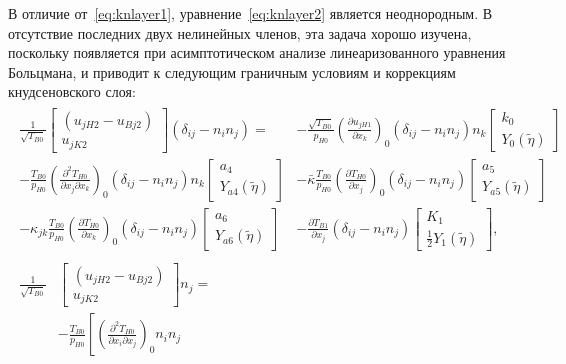 \documentclass[
aps,%
12pt,%
final,%
notitlepage,%
oneside,%
onecolumn,%
nobibnotes,%
nofootinbib,%
superscriptaddress,%
noshowpacs,%
showkeys,%
floatfix,%
tightenlines,%
centertags]%
{revtex4}
\newcommand{\pder}[2][]{\frac{\partial#1}{\partial#2}}
\newcommand{\pderder}[3][]{\frac{\partial^2#1}{\partial#2\partial#3}}
\newcommand{\deltann}[2]{(\delta_{#1#2}-n_#1 n_#2)}
\newcommand{\onwall}[1]{\left(#1\right)_0}
\begin{document}
В отличие от~\eqref{eq:knlayer1}, уравнение~\eqref{eq:knlayer2} является неоднородным.
В отсутствие последних двух нелинейных членов, эта задача хорошо изучена, поскольку появляется
при асимптотическом анализе линеаризованного уравнения Больцмана,
и приводит к следующим граничным условиям и коррекциям кнудсеновского слоя:
\begin{gather}
    \begin{aligned}
        \frac1{\sqrt{T_{B0}}}
            \begin{bmatrix} (u_{jH2} - u_{Bj2}) \\ u_{jK2} \end{bmatrix}\deltann{i}{j} =
        &- \frac{\sqrt{T_{B0}}}{p_{H0}}\onwall{\pder[u_{jH1}]{x_k}} \deltann{i}{j}n_k
            \begin{bmatrix} k_0 \\ Y_0(\tilde\eta) \end{bmatrix} \\
        - \frac{T_{B0}}{p_{H0}}\onwall{\pderder[T_{H0}]{x_j}{x_k}} \deltann{i}{j}n_k
            \begin{bmatrix} a_4 \\ Y_{a4}(\tilde\eta) \end{bmatrix}
        &- \bar\kappa\frac{T_{B0}}{p_{H0}}\onwall{\pder[T_{H0}]{x_j}} \deltann{i}{j}
            \begin{bmatrix} a_5 \\ Y_{a5}(\tilde\eta) \end{bmatrix} \\
        - \kappa_{jk}\frac{T_{B0}}{p_{H0}}\onwall{\pder[T_{H0}]{x_k}} \deltann{i}{j}
            \begin{bmatrix} a_6 \\ Y_{a6}(\tilde\eta) \end{bmatrix}
        &- \pder[T_{B1}]{x_j} \deltann{i}{j}
            \begin{bmatrix} K_1 \\ \frac12 Y_1(\tilde\eta) \end{bmatrix},
    \end{aligned}\label{eq:boundary_u2t}\\
    \begin{aligned}
        \frac1{\sqrt{T_{B0}}}
            &\begin{bmatrix} (u_{jH2} - u_{Bj2}) \\ u_{jK2} \end{bmatrix} n_j = \\
        &- \frac{T_{B0}}{p_{H0}}\left[ \onwall{\pderder[T_{H0}]{x_i}{x_j}}n_i n_j

\end{aligned}
\end{gather}
\end{document}

